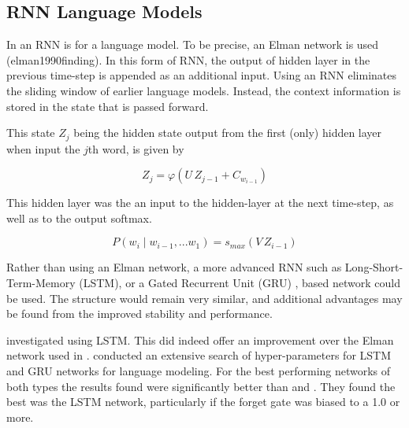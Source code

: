 \documentclass[parskip]{komatufte}
\begin{document}
\subsection{RNN Language Models}



In  an RNN is for a language model.
To be precise, an Elman network is used \tcite(elman1990finding).
In this form of RNN, the output of hidden layer in the previous time-step is appended as an additional input.
Using an RNN eliminates the sliding window of earlier language models.
Instead, the context information is stored in the state that is passed forward.

This state $Z_{j}$ being the hidden state output from the first (only) hidden layer when input the $j$th word, 
is given by 

\begin{equation}
	Z_{j} = \varphi\left( U\,Z_{j-1} + C_{w_{i-1}} \right)
\end{equation}


This hidden layer was the an input to the hidden-layer at the next time-step, as well as to the output softmax.

\begin{equation}
	P(w_i \mid w_{i-1}, ... w_{1}) = s_{max}\left(V \, Z_{i-1} \right)
\end{equation}



Rather than using an Elman network, a more advanced RNN such as Long-Short-Term-Memory (LSTM), or a Gated Recurrent Unit (GRU) , based network could be used.
The structure would remain very similar,
and additional advantages may be found from the improved stability and performance.

 investigated using LSTM.
This did indeed offer an improvement over the Elman network used in \textcite{mikolov2010recurrent}.
 conducted an extensive search of hyper-parameters for LSTM and GRU networks for language modeling.
For the best performing networks of both types the results found were significantly better than \textcite{sundermeyer2012lstm} and \textcite{mikolov2010recurrent}.
They found the best was the LSTM network, particularly if the forget gate was biased to a 1.0 or more.
\end{document}
